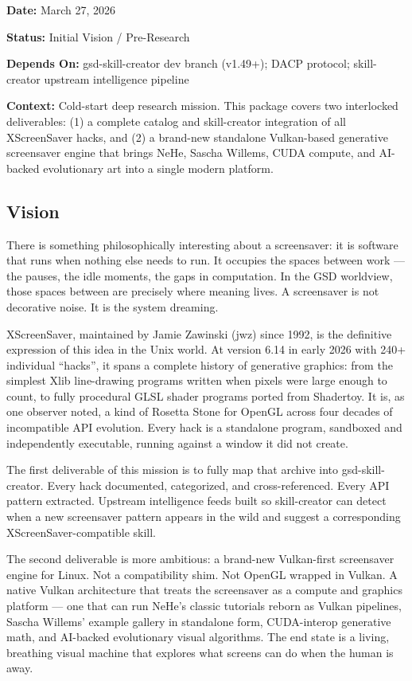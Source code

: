 \documentclass[11pt,letterpaper]{article}
\newcommand{\metafield}[2]{\textbf{\sffamily #1} #2\par}
\begin{document}
\metafield{Date:}{March 27, 2026}
\metafield{Status:}{Initial Vision / Pre-Research}
\metafield{Depends On:}{gsd-skill-creator dev branch (v1.49+); DACP protocol; skill-creator upstream intelligence pipeline}
\metafield{Context:}{Cold-start deep research mission. This package covers two interlocked deliverables: (1) a complete catalog and skill-creator integration of all XScreenSaver hacks, and (2) a brand-new standalone Vulkan-based generative screensaver engine that brings NeHe, Sascha Willems, CUDA compute, and AI-backed evolutionary art into a single modern platform.}

\subsection{Vision}

There is something philosophically interesting about a screensaver: it is software that runs when nothing else needs to run. It occupies the spaces between work --- the pauses, the idle moments, the gaps in computation. In the GSD worldview, those spaces between are precisely where meaning lives. A screensaver is not decorative noise. It is the system dreaming.

XScreenSaver, maintained by Jamie Zawinski (jwz) since 1992, is the definitive expression of this idea in the Unix world. At version 6.14 in early 2026 with 240+ individual ``hacks'', it spans a complete history of generative graphics: from the simplest Xlib line-drawing programs written when pixels were large enough to count, to fully procedural GLSL shader programs ported from Shadertoy. It is, as one observer noted, a kind of Rosetta Stone for OpenGL across four decades of incompatible API evolution. Every hack is a standalone program, sandboxed and independently executable, running against a window it did not create.

The first deliverable of this mission is to fully map that archive into gsd-skill-creator. Every hack documented, categorized, and cross-referenced. Every API pattern extracted. Upstream intelligence feeds built so skill-creator can detect when a new screensaver pattern appears in the wild and suggest a corresponding XScreenSaver-compatible skill.

The second deliverable is more ambitious: a brand-new Vulkan-first screensaver engine for Linux. Not a compatibility shim. Not OpenGL wrapped in Vulkan. A native Vulkan architecture that treats the screensaver as a compute and graphics platform --- one that can run NeHe's classic tutorials reborn as Vulkan pipelines, Sascha Willems' example gallery in standalone form, CUDA-interop generative math, and AI-backed evolutionary visual algorithms. The end state is a living, breathing visual machine that explores what screens can do when the human is away.
\end{document}
